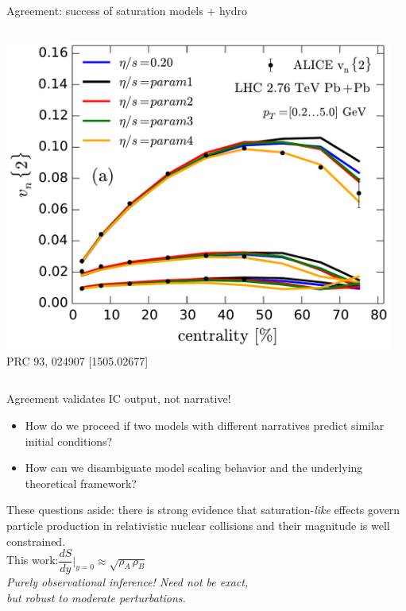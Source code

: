 \documentclass{beamer}
\begin{document}
\begin{frame}[plain]{Agreement: success of saturation models + hydro}
\begin{columns}
\begin{column}{.4\textwidth}
      \includegraphics[width=.91\columnwidth]{vn_ekrt} \\
      {\tiny PRC 93, 024907 [1505.02677]}
    \end{column}
    \begin{column}{.075\textwidth}
    \end{column}
  \end{columns}
\end{frame}

\begin{frame}{Agreement validates IC output, not narrative!}
  \begin{itemize}
  \large
  \item[\faicon{question-circle-o}] How do we proceed if two models with different narratives predict similar initial conditions?\\[2ex] 
  \item[\faicon{wrench}] How can we disambiguate model scaling behavior and the underlying theoretical framework?
  \end{itemize}
  \begin{center}
    These questions aside: there is strong evidence that saturation-\emph{like} effects govern particle production in relativistic nuclear collisions and their magnitude is well constrained.\\[2ex]
    This work:\quad $\dfrac{dS}{dy}\Big\vert_{y=0} \approx \sqrt{\rho_A \,\rho_B}$\\[2ex]
    \emph{Purely observational inference! Need not be exact,\\but robust to moderate perturbations.}
  \end{center}
\end{frame}
\end{document}
